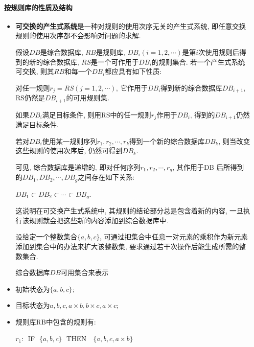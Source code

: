 \paragraph{按规则库的性质及结构}
\begin{itemize}
\item \textbf{可交换的产生式系统}是一种对规则的使用次序无关的产生式系统, 即任意交换规则的使用次序都不会影响对问题的求解.

\quad 假设$DB$是综合数据库, $RB$是规则库, $DB_i (i=1,2,\cdots)$是第$i$次使用规则后得到的新的综合数据库, $RS$是一个可作用于$DB_i$的规则集合. 若一个产生式系统可交换, 则其$RB$和每一个$DB_i$都应具有如下性质:

    \quad{} 对任一规则$r_j=RS (j=1,2,\cdots)$, 它作用于$DB_i$得到新的综合数据库$DB_{i+1}$, RS仍然是$DB_{i+1}$的可用规则集.

    \quad{}  如果$DB_i$满足目标条件, 则用RS中的任一规则$r_j$作用于$DB_i$, 得到的$DB_{i+1}$仍然满足目标条件.

    \quad{}  若对$DB_i$使用某一规则序列$r_1,r_2,\cdots,r_k$得到一个新的综合数据库$DB_k$, 则当改变这些规则的使用次序后, 仍然可得到$DB_k$.

\quad 可见, 综合数据库是递增的, 即对任何序列$r_1,r_2,\cdots,r_g$, 其作用于DB 后所得到的$DB_1,DB_2,\cdots,DB_g$之间存在如下关系:
\begin{center}
  $DB_1\subset  DB_2\subset  \cdots\subset DB_g$.
\end{center}
\begin{remark}
  这说明在可交换产生式系统中, 其规则的结论部分总是包含着新的内容, 一旦执行该规则就会把这些新的内容添加到综合数据库中.
\end{remark}

\begin{example}
  设给定一个整数集合$\{a,b,c\}$, 可通过把集合中任意一对元素的乘积作为新元素添加到集合中的办法来扩大该整数集, 要求通过若干次操作后能生成所需的整数集合.
\end{example}
综合数据库$DB$可用集合来表示

\item 初始状态为$\{a,b,c\}$;
\item 目标状态为${a, b, c, a\times b, b\times c, a\times c}$;
\item 规则库RB中包含的规则有:

    \quad$r_1$:\,\,   IF\,\,      $\{a,b,c\}$\,\,      THEN \,\,      $\{a, b, c, a\times b \}$


\end{itemize}
